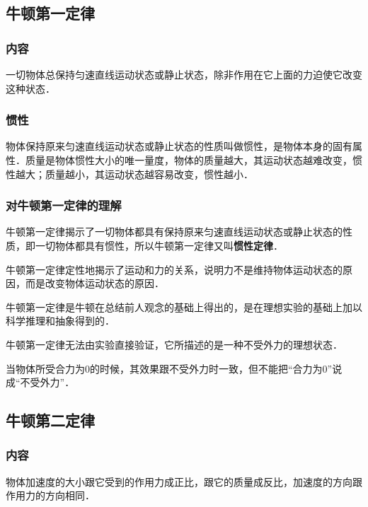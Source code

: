 
\begin{issues}
\issueDraft
\issueTODO
\end{issues}


\subsection{牛顿第一定律}
\subsubsection{内容}
一切物体总保持匀速直线运动状态或静止状态，除非作用在它上面的力迫使它改变这种状态．

\subsubsection{惯性}
物体保持原来匀速直线运动状态或静止状态的性质叫做惯性，是物体本身的固有属性．质量是物体惯性大小的唯一量度，物体的质量越大，其运动状态越难改变，惯性越大；质量越小，其运动状态越容易改变，惯性越小．

\subsubsection{对牛顿第一定律的理解}
牛顿第一定律揭示了一切物体都具有保持原来匀速直线运动状态或静止状态的性质，即一切物体都具有惯性，所以牛顿第一定律又叫\textbf{惯性定律}．

牛顿第一定律定性地揭示了运动和力的关系，说明力不是维持物体运动状态的原因，而是改变物体运动状态的原因．

牛顿第一定律是牛顿在总结前人观念的基础上得出的，是在理想实验的基础上加以科学推理和抽象得到的．

牛顿第一定律无法由实验直接验证，它所描述的是一种不受外力的理想状态．

当物体所受合力为0的时候，其效果跟不受外力时一致，但不能把“合力为0”说成“不受外力”．

\subsection{牛顿第二定律}
\subsubsection{内容}
物体加速度的大小跟它受到的作用力成正比，跟它的质量成反比，加速度的方向跟作用力的方向相同．

